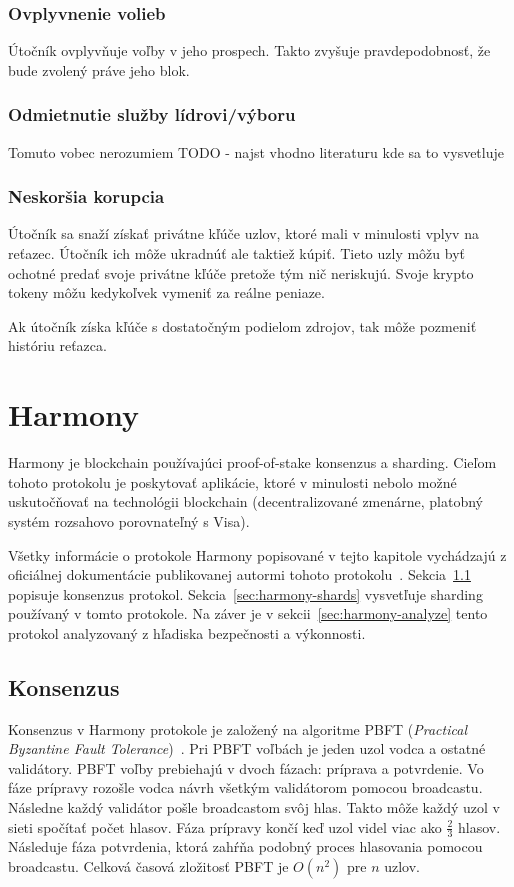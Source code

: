 \subsection{Ovplyvnenie volieb}
Útočník ovplyvňuje voľby v jeho prospech. Takto zvyšuje pravdepodobnosť, že bude zvolený práve jeho blok. 

\subsection{Odmietnutie služby lídrovi/výboru}

Tomuto vobec nerozumiem TODO - najst vhodno literaturu kde sa to vysvetluje

\subsection{Neskoršia korupcia}
Útočník sa snaží získať privátne kľúče uzlov, ktoré mali v minulosti vplyv na reťazec. Útočník ich môže ukradnúť ale taktiež kúpiť. Tieto uzly môžu byť ochotné predať svoje privátne kľúče pretože tým nič neriskujú. Svoje krypto tokeny môžu kedykoľvek vymeniť za reálne peniaze.

Ak útočník získa kľúče s dostatočným podielom zdrojov, tak môže pozmeniť históriu reťazca. 

\chapter{Harmony}\label{chap:harmony}

Harmony je blockchain používajúci proof-of-stake konsenzus a sharding. Cieľom tohoto protokolu je poskytovať aplikácie, ktoré v minulosti nebolo možné uskutočňovať na technológii blockchain (decentralizované zmenárne, platobný systém rozsahovo porovnateľný s Visa).

Všetky informácie o protokole Harmony popisované v tejto kapitole vychádzajú z oficiálnej dokumentácie publikovanej autormi tohoto protokolu~\cite{harmonyWp}. Sekcia~\ref{sec:harmony-cons} popisuje konsenzus protokol. Sekcia~\ref{sec:harmony-shards} vysvetľuje sharding používaný v tomto protokole.  Na záver je v sekcii~\ref{sec:harmony-analyze} tento protokol analyzovaný z hľadiska bezpečnosti a výkonnosti.

\section{Konsenzus}\label{sec:harmony-cons}

Konsenzus v Harmony protokole je založený na algoritme PBFT (\textit{Practical Byzantine Fault Tolerance})~\cite{pbftCastro}. Pri PBFT voľbách je jeden uzol vodca a ostatné validátory. PBFT voľby prebiehajú v dvoch fázach: príprava a potvrdenie. Vo fáze prípravy rozošle vodca návrh všetkým validátorom pomocou broadcastu. Následne každý validátor pošle broadcastom svôj hlas. Takto môže každý uzol v sieti spočítať počet hlasov. Fáza prípravy končí keď uzol videl viac ako $\frac{2}{3}$ hlasov. Následuje fáza potvrdenia, ktorá zahŕňa podobný proces hlasovania pomocou broadcastu. Celková časová zložitosť PBFT je $O(n^2)$ pre $n$ uzlov.

